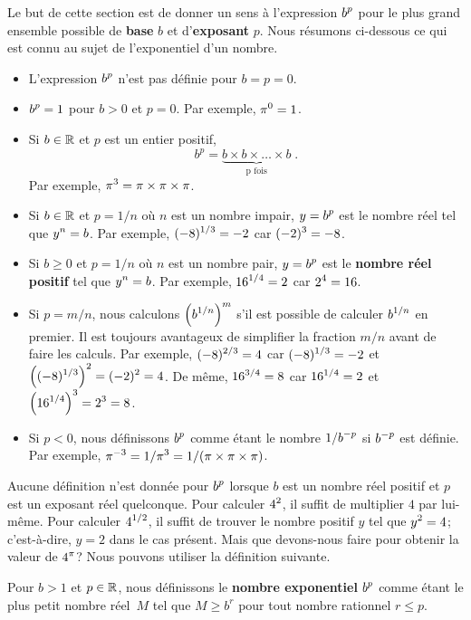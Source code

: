 {Le but de cette section est de donner un sens à l'expression $\displaystyle b^p$
pour le plus grand ensemble possible de {\bfseries base} $b$ et
d'{\bfseries exposant} $p$.  Nous résumons ci-dessous ce qui est connu
au sujet de l'exponentiel d'un nombre.

{\renewcommand{\labelitemi}{\textbullet}
\begin{itemize}
\item L'expression $\displaystyle b^p$ n'est pas définie pour $b=p=0$.
\item $\displaystyle b^p =1$ pour $b>0$ et $p=0$.  Par exemple, $\displaystyle \pi^0 = 1$.
\item Si $b \in \mathbb{R}$ et $p$ est un entier positif,
\[
b^{p} = \underbrace{b \times b \times \ldots \times b}_{\text{p fois}}
\; .
\]
Par exemple, $\displaystyle \pi^3 = \pi \times \pi \times \pi$.
\item Si $b \in \mathbb{R}$ et $p = 1/n$ où $n$ est un nombre impair, $\displaystyle y=b^p$
  est le nombre réel tel que $\displaystyle y^n = b$.  Par exemple,
  $\displaystyle (-8)^{1/3} = -2$ car $\displaystyle (-2)^3 = -8$.
\item Si $b \geq 0$ et $p = 1/n$ où $n$ est un nombre pair, $\displaystyle y=b^p$
  est le {\bfseries nombre réel positif} tel que $\displaystyle y^n = b$.  Par exemple,
  $\displaystyle 16^{1/4} = 2$ car $\displaystyle 2^4 = 16$.
\item Si $p = m/n$, nous calculons $\displaystyle \left(b^{1/n}\right)^m$
  s'il est possible de calculer $\displaystyle b^{1/n}$ en premier.
  Il est toujours avantageux de simplifier la fraction $m/n$ avant de
  faire les calculs.  Par exemple, $\displaystyle (-8)^{2/3} = 4$ car
  $\displaystyle (-8)^{1/3} = -2$ et $\displaystyle \left((-8)^{1/3}\right)^2 = (-2)^2 = 4$.
  De même, $\displaystyle 16^{3/4} = 8$ car $\displaystyle 16^{1/4} =2$ et
  $\displaystyle \left(16^{1/4}\right)^3 = 2^3 = 8$.
\item Si $p<0$, nous définissons $\displaystyle b^p$ comme étant le nombre
  $\displaystyle 1/b^{-p}$ si $\displaystyle b^{-p}$ est définie.  Par exemple,
  $\displaystyle \pi^{-3} = 1/\pi^3 = 1/(\pi \times \pi \times \pi)$.
\end{itemize}
}

Aucune définition n'est donnée pour $\displaystyle b^p$ lorsque $b$ est un nombre
réel positif et $p$ est un exposant réel quelconque.  Pour calculer
$\displaystyle 4^2$, il suffit de multiplier $4$ par lui-même.  Pour calculer
$\displaystyle 4^{1/2}$, il suffit de trouver le nombre positif $y$ tel que $\displaystyle y^2=4$;
c'est-à-dire, $y=2$ dans le cas présent.  Mais que devons-nous faire
pour obtenir la valeur de $\displaystyle 4^\pi$?  Nous pouvons utiliser
la définition suivante.

\begin{defn} \label{pr_def_of_exp}
Pour $b >1$ et $p \in \mathbb{R}$, nous définissons le {\bfseries nombre exponentiel}
$\displaystyle b^p$ comme étant le plus petit nombre réel\footnotemark\ $M$ tel que
$M \geq  b^r$ pour tout nombre rationnel $r\leq p$.


\end{defn}}
